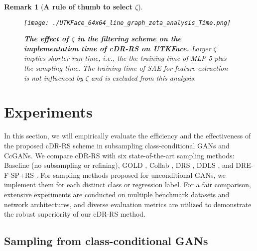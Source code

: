 \documentclass[final,12pt, 3p,times]{elsarticle}
\newtheorem{remark}{Remark}
\begin{document}
\begin{remark}[\textbf{A rule of thumb to select $\zeta$}]
{    }
    






    
    \begin{figure}[!htbp]
    	\centering
    	\texttt{[image: ./UTKFace\_64x64\_line\_graph\_zeta\_analysis\_Time.png]}  \caption{\textbf{The effect of $\zeta$ in the filtering scheme on the implementation time of cDR-RS on UTKFace.} Larger $\zeta$ implies shorter run time, i.e., the the training time of MLP-5 plus the sampling time. The training time of SAE for feature extraction is not influenced by $\zeta$ and is excluded from this analysis.}
    	\label{fig:UTKFace_zeta_vs_total_time}
    \end{figure}
    
\end{remark}



\section{Experiments}\label{sec:experiment}
In this section, we will empirically evaluate the efficiency and the effectiveness of the proposed cDR-RS scheme in subsampling class-conditional GANs and CcGANs. We compare cDR-RS with six state-of-the-art sampling methods: Baseline (no subsampling or refining), GOLD \cite{mo2019mining}, Collab \cite{liu2020collaborative}, DRS \cite{azadi2018discriminator}, DDLS \cite{che2020your}, and DRE-F-SP+RS \cite{ding2020subsampling}. For sampling methods proposed for unconditional GANs, we implement them for each distinct class or regression label. For a fair comparison, extensive experiments are conducted on multiple benchmark datasets and network architectures, and diverse evaluation metrics are utilized to demonstrate the robust superiority of our cDR-RS method. 


\subsection{Sampling from class-conditional GANs}\label{sec:experiment_classification}
\end{document}
